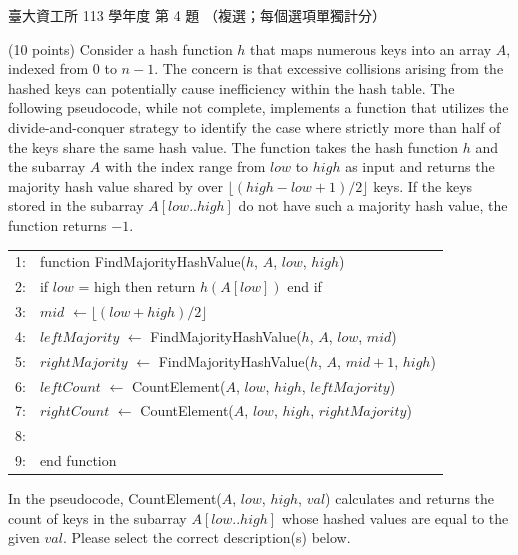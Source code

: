 \begin{pastexam}[label={px:ntu-113-dsa-04}]{臺大資工所 113 學年度 第 4 題}
（複選；每個選項單獨計分）

(10 points) Consider a hash function $h$ that maps numerous keys into an array $A$, indexed from 0 to
$n-1$. The concern is that excessive collisions arising from the hashed keys can potentially cause
inefficiency within the hash table. The following pseudocode, while not complete, implements a
function that utilizes the divide-and-conquer strategy to identify the case where strictly more than
half of the keys share the same hash value. The function takes the hash function $h$ and the
subarray $A$ with the index range from $\mathit{low}$ to $\mathit{high}$ as input and returns the
majority hash value shared by over $\lfloor(\mathit{high}-\mathit{low}+1)/2\rfloor$ keys. If the keys
stored in the subarray $A[\mathit{low}..\mathit{high}]$ do not have such a majority hash value, the
function returns $-1$.
\begin{center}
\begin{tabular}{rl}
1: & function FindMajorityHashValue($h$, $A$, $\mathit{low}$, $\mathit{high}$) \\
2: & \quad if $\mathit{low}$ = high then return $h(A[\mathit{low}])$ end if \\
3: & \quad $\mathit{mid}$ $\leftarrow\lfloor(\mathit{low}+\mathit{high})/2\rfloor$ \\
4: & \quad $\mathit{leftMajority}$ $\leftarrow$ FindMajorityHashValue($h$, $A$, $\mathit{low}$, $\mathit{mid}$) \\
5: & \quad $\mathit{rightMajority}$ $\leftarrow$ FindMajorityHashValue($h$, $A$, $\mathit{mid}+1$, $\mathit{high}$) \\
6: & \quad $\mathit{leftCount}$ $\leftarrow$ CountElement($A$, $\mathit{low}$, $\mathit{high}$, $\mathit{leftMajority}$) \\
7: & \quad $\mathit{rightCount}$ $\leftarrow$ CountElement($A$, $\mathit{low}$, $\mathit{high}$, $\mathit{rightMajority}$) \\
8: & \quad \fbox{\makebox[0.55\linewidth]{\strut}} \\
9: & end function
\end{tabular}
\end{center}
In the pseudocode, CountElement($A$, $\mathit{low}$, $\mathit{high}$, $\mathit{val}$) calculates and
returns the count of keys in the subarray $A[\mathit{low}..\mathit{high}]$ whose hashed values are
equal to the given $\mathit{val}$. Please select the correct description(s) below.

\end{pastexam}
